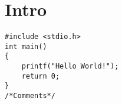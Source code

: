 \documentclass[11pt, letterpaper]{article}
\author{}
\date{}
\title{}
\begin{document}
\maketitle
\newpage
\tableofcontents
\newpage
\section{Intro}
\begin{lstlisting}
#include <stdio.h>
int main()
{
    printf("Hello World!");
    return 0;
}
/*Comments*/
\end{lstlisting}
%
\end{document}
